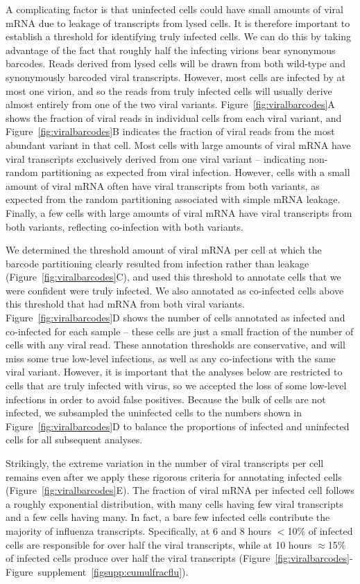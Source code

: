 \documentclass[9pt,lineno]{elife}
\begin{document}
A complicating factor is that uninfected cells could have small amounts of viral mRNA due to leakage of transcripts from lysed cells.
It is therefore important to establish a threshold for identifying truly infected cells.
We can do this by taking advantage of the fact that roughly half the infecting virions bear synonymous barcodes.
Reads derived from lysed cells will be drawn from both wild-type and synonymously barcoded viral transcripts.
However, most cells are infected by at most one virion, and so the reads from truly infected cells will usually derive almost entirely from one of the two viral variants. 
Figure~\ref{fig:viralbarcodes}A shows the fraction of viral reads in individual cells from each viral variant, and Figure~\ref{fig:viralbarcodes}B indicates the fraction of viral reads from the most abundant variant in that cell.
Most cells with large amounts of viral mRNA have viral transcripts exclusively derived from one viral variant -- indicating non-random partitioning as expected from viral infection.
However, cells with a small amount of viral mRNA often have viral transcripts from both variants, as expected from the random partitioning associated with simple mRNA leakage.
Finally, a few cells with large amounts of viral mRNA have viral transcripts from both variants, reflecting co-infection with both variants.

We determined the threshold amount of viral mRNA per cell at which the barcode partitioning clearly resulted from infection rather than leakage (Figure~\ref{fig:viralbarcodes}C), and used this threshold to annotate cells that we were confident were truly infected.
We also annotated as co-infected cells above this threshold that had mRNA from both viral variants.
Figure~\ref{fig:viralbarcodes}D shows the number of cells annotated as infected and co-infected for each sample -- these cells are just a small fraction of the number of cells with any viral read.
These annotation thresholds are conservative, and will miss some true low-level infections, as well as any co-infections with the same viral variant.
However, it is important that the analyses below are restricted to cells that are truly infected with virus, so we accepted the loss of some low-level infections in order to avoid false positives.
Because the bulk of cells are not infected, we subsampled the uninfected cells to the numbers shown in Figure~\ref{fig:viralbarcodes}D to balance the proportions of infected and uninfected cells for all subsequent analyses.

Strikingly, the extreme variation in the number of viral transcripts per cell remains even after we apply these rigorous criteria for annotating infected cells (Figure~\ref{fig:viralbarcodes}E). 
The fraction of viral mRNA per infected cell follows a roughly exponential distribution, with many cells having few viral transcripts and a few cells having many.
In fact, a bare few infected cells contribute the majority of influenza transcripts.
Specifically, at 6 and 8 hours $<$10\% of infected cells are responsible for over half the viral transcripts, while at 10 hours $\approx$15\% of infected cells produce over half the viral transcripts (Figure~\ref{fig:viralbarcodes}-Figure~supplement~\ref{figsupp:cumulfracflu}).
\end{document}
